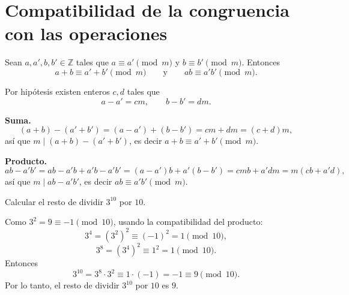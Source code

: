 \section{Compatibilidad de la congruencia con las operaciones}

\begin{proposicion}
Sean $a,a',b,b' \in \mathbb{Z}$ tales que $a \equiv a' \pmod m$ y
$b \equiv b' \pmod m$. Entonces
\[
a+b \equiv a'+b' \pmod m \qquad \text{y} \qquad ab \equiv a'b' \pmod m.
\]
\end{proposicion}

\begin{demostracion}
Por hipótesis existen enteros $c,d$ tales que
\[
a-a' = cm, \qquad b-b' = dm.
\]

\textbf{Suma.}
\[
(a+b)-(a'+b') = (a-a')+(b-b') = cm+dm = (c+d)m,
\]
así que $m \mid (a+b)-(a'+b')$, es decir $a+b\equiv a'+b' \pmod m$.

\textbf{Producto.}
\[
ab-a'b' = ab-a'b+a'b-a'b' = (a-a')b + a'(b-b') = cmb + a'dm =
m(cb+a'd),
\]
así que $m \mid ab-a'b'$, es decir $ab\equiv a'b' \pmod m$.
\end{demostracion}

\begin{ejemplo}
Calcular el resto de dividir $3^{10}$ por $10$.

Como $3^2=9\equiv -1 \pmod{10}$, usando la compatibilidad del
producto:
\[
3^4 = (3^2)^2 \equiv (-1)^2 = 1 \pmod{10},
\]
\[
3^8 = (3^4)^2 \equiv 1^2 = 1 \pmod{10}.
\]
Entonces
\[
3^{10} = 3^8 \cdot 3^2 \equiv 1\cdot(-1) = -1 \equiv 9 \pmod{10}.
\]
Por lo tanto, el resto de dividir $3^{10}$ por $10$ es $9$.
\end{ejemplo}